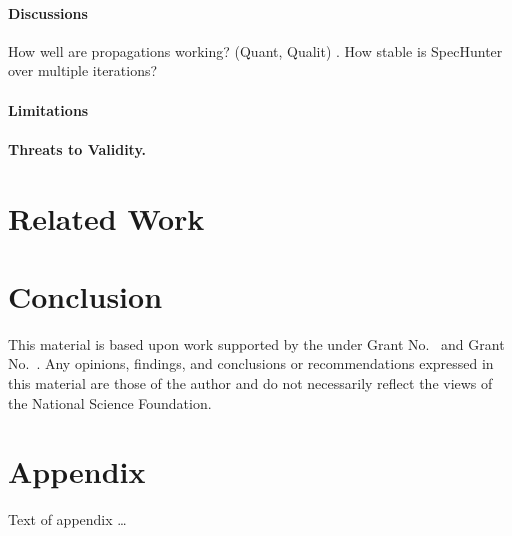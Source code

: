 \documentclass[sigconf,review,anonymous]{acmart}\settopmatter{printfolios=true,printccs=false,printacmref=false}
\begin{document}

\paragraph{Discussions}
How well are propagations working? (Quant, Qualit) .
How stable is SpecHunter over multiple iterations?
\paragraph{Limitations}

\paragraph{Threats to Validity.}


\section{Related Work}


\section{Conclusion}


\begin{acks}                            %
  This material is based upon work supported by the
   under Grant
  No.~ and Grant
  No.~. Any opinions, findings, and
  conclusions or recommendations expressed in this material are those
  of the author and do not necessarily reflect the views of the
  National Science Foundation.
\end{acks}


% 


\appendix
\section{Appendix}

Text of appendix \ldots
\end{document}
